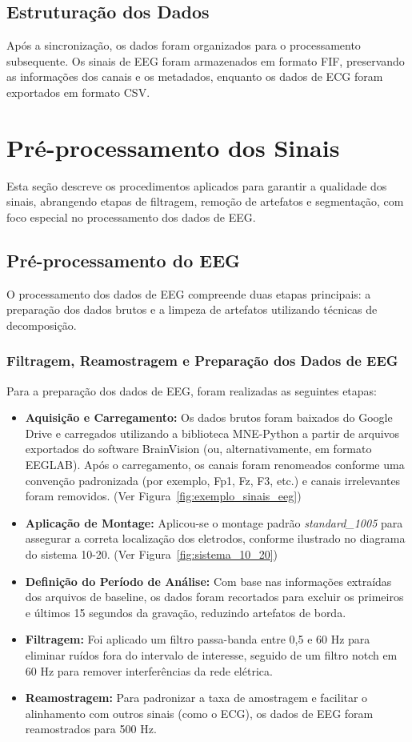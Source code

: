\subsection{Estruturação dos Dados}
Após a sincronização, os dados foram organizados para o processamento subsequente. Os sinais de EEG foram armazenados em formato FIF, preservando as informações dos canais e os metadados, enquanto os dados de ECG foram exportados em formato CSV.
\section{Pré-processamento dos Sinais}

Esta seção descreve os procedimentos aplicados para garantir a qualidade dos sinais, abrangendo etapas de filtragem, remoção de artefatos e segmentação, com foco especial no processamento dos dados de EEG.

\subsection{Pré-processamento do EEG}

O processamento dos dados de EEG compreende duas etapas principais: a preparação dos dados brutos e a limpeza de artefatos utilizando técnicas de decomposição.

\subsubsection{Filtragem, Reamostragem e Preparação dos Dados de EEG}
Para a preparação dos dados de EEG, foram realizadas as seguintes etapas:
\begin{itemize}
    \item \textbf{Aquisição e Carregamento:} Os dados brutos foram baixados do Google Drive e carregados utilizando a biblioteca MNE-Python a partir de arquivos exportados do software BrainVision (ou, alternativamente, em formato EEGLAB). Após o carregamento, os canais foram renomeados conforme uma convenção padronizada (por exemplo, Fp1, Fz, F3, etc.) e canais irrelevantes foram removidos. (Ver Figura~\ref{fig:exemplo_sinais_eeg})
    \item \textbf{Aplicação de Montage:} Aplicou-se o montage padrão \textit{standard\_1005} para assegurar a correta localização dos eletrodos, conforme ilustrado no diagrama do sistema 10-20. (Ver Figura~\ref{fig:sistema_10_20})
    \item \textbf{Definição do Período de Análise:} Com base nas informações extraídas dos arquivos de baseline, os dados foram recortados para excluir os primeiros e últimos 15 segundos da gravação, reduzindo artefatos de borda.
    \item \textbf{Filtragem:} Foi aplicado um filtro passa-banda entre 0,5 e 60 Hz para eliminar ruídos fora do intervalo de interesse, seguido de um filtro notch em 60 Hz para remover interferências da rede elétrica.
    \item \textbf{Reamostragem:} Para padronizar a taxa de amostragem e facilitar o alinhamento com outros sinais (como o ECG), os dados de EEG foram reamostrados para 500 Hz.
\end{itemize}

